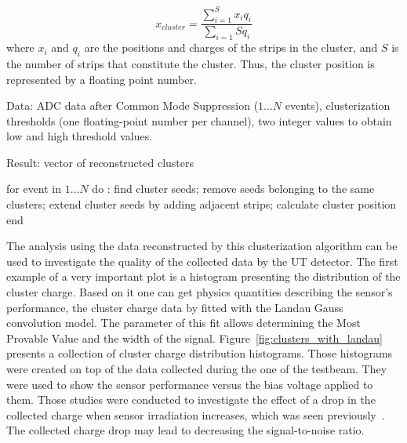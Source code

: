 \begin{equation}
    x_{cluster} = \frac{\sum^{S}_{i=1}x_i q_i}{{\sum_{i=1}{S}{q_i}}}
\end{equation}
where $x_i$ and $q_i$ are the positions and charges of
the strips in the cluster, and $S$ is the number of strips that constitute the cluster. Thus, the cluster position is represented by a floating point number. 

\begin{algorithm}[caption={Cluster Creator algorithm}, label={al:cluster creator}]
Data: ADC data after Common Mode Suppression ($1 \ldots N$ events),
      clusterization thresholds (one floating-point number per channel),  
      two integer values to obtain low and high threshold values. 

Result: vector of reconstructed clusters

for event in $1 \ldots N$ do :
   find cluster seeds;
   remove seeds belonging to the same clusters;
   extend cluster seeds by adding adjacent strips;
   calculate cluster position
end
\end{algorithm}

The analysis using the data reconstructed by this clusterization algorithm can be used to investigate the quality of the collected data by the UT detector. The first example of a very important plot is a histogram presenting the distribution of the cluster charge. Based on it one can get physics quantities describing the sensor's performance, the cluster charge data by fitted with the Landau Gauss convolution model. The parameter of this fit allows determining the Most Provable Value and the width of the signal.  Figure~\ref{fig:clusters_with_landau} presents a collection of cluster charge distribution histograms. Those histograms were created on top of the data collected during the one of the testbeam. They were used to show the sensor performance versus the bias voltage applied to them.  Those studies were conducted to investigate the effect of a drop in the collected charge when sensor irradiation increases, which was seen previously~\cite{irradiation}. The collected charge drop may lead to decreasing the signal-to-noise ratio.  


